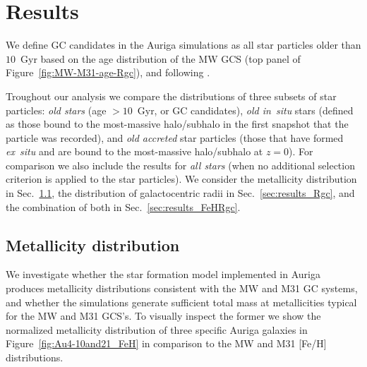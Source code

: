 \documentclass[a4paper,fleqn,usenatbib]{mnras}
\begin{document}
\section{Results}
\label{sec:results}
We define GC candidates in the Auriga simulations as all star particles older
than $10$~Gyr based on the age distribution of the MW GCS (top panel of 
Figure~\ref{fig:MW-M31-age-Rgc}), and following \citet{2017MNRAS.465.3622R}.

Troughout our analysis we compare the distributions of three subsets of star
particles: \emph{old stars} (age $>10$~Gyr, or GC candidates), \emph{old in~situ}
stars (defined as those bound to the most-massive halo/subhalo in the first
snapshot that the particle was recorded), and \emph{old accreted} star particles
(those that have formed {\it ex~situ} and are bound to the most-massive halo/subhalo
at $z=0$). For comparison we also include the results for \emph{all stars} (when
no additional selection criterion is applied to the star particles). We consider
the metallicity distribution in Sec.~\ref{sec:results_FeH}, the distribution of
galactocentric radii in Sec.~\ref{sec:results_Rgc}, and the combination of both
in Sec.~\ref{sec:results_FeHRgc}.


\subsection{Metallicity distribution}
\label{sec:results_FeH}
We investigate whether the star formation model implemented in Auriga produces
metallicity distributions consistent with the MW and M31 GC systems, and whether
the simulations generate sufficient total mass at metallicities typical for the
MW and M31 GCS's. To visually inspect the former we show the normalized metallicity 
distribution of three specific Auriga galaxies in Figure~\ref{fig:Au4-10and21_FeH}
in comparison to the MW and M31 [Fe/H] distributions.
\end{document}
